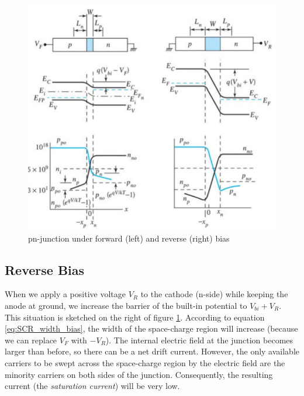 \begin{figure}[h!]
\centering
\includegraphics[width=12cm]{figures/ch01/pn_bias.jpg}
\caption{pn-junction under forward (left) and reverse (right) bias} 
\label{fig:pn_bias}
\end{figure}

\subsection{Reverse Bias}
When we apply a positive voltage $V_R$ to the cathode (n-side) while keeping the anode at ground, we increase the barrier of the built-in potential to $V_{bi} + V_R$. This situation is sketched on the right of figure \ref{fig:pn_bias}. According to equation \ref{eq:SCR_width_bias}, the width of the space-charge region will increase (because we can replace $V_F$ with $-V_R$). The internal electric field at the junction becomes larger than before, so there can be a net drift current. However, the only available carriers to be swept across the space-charge region by the electric field are the minority carriers on both sides of the junction. Consequently, the resulting current (the \emph{saturation current}) will be very low.

